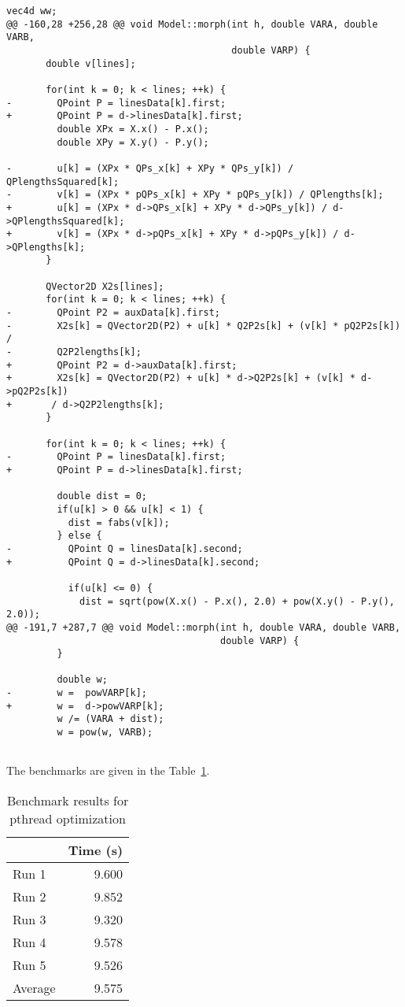 \documentclass[12pt]{article}
\begin{document}
\begin{lstlisting}[caption={Pthreads},label={lst:Pthreads}]
       vec4d ww;
@@ -160,28 +256,28 @@ void Model::morph(int h, double VARA, double VARB, 
                                        double VARP) {
       double v[lines];
 
       for(int k = 0; k < lines; ++k) {
-        QPoint P = linesData[k].first;
+        QPoint P = d->linesData[k].first;
         double XPx = X.x() - P.x();
         double XPy = X.y() - P.y();
 
-        u[k] = (XPx * QPs_x[k] + XPy * QPs_y[k]) / QPlengthsSquared[k];
-        v[k] = (XPx * pQPs_x[k] + XPy * pQPs_y[k]) / QPlengths[k];        
+        u[k] = (XPx * d->QPs_x[k] + XPy * d->QPs_y[k]) / d->QPlengthsSquared[k];
+        v[k] = (XPx * d->pQPs_x[k] + XPy * d->pQPs_y[k]) / d->QPlengths[k];        
       }
 
       QVector2D X2s[lines];
       for(int k = 0; k < lines; ++k) {
-        QPoint P2 = auxData[k].first;
-        X2s[k] = QVector2D(P2) + u[k] * Q2P2s[k] + (v[k] * pQ2P2s[k]) / 
-        Q2P2lengths[k];
+        QPoint P2 = d->auxData[k].first;
+        X2s[k] = QVector2D(P2) + u[k] * d->Q2P2s[k] + (v[k] * d->pQ2P2s[k]) 
+       / d->Q2P2lengths[k];
       }
 
       for(int k = 0; k < lines; ++k) {
-        QPoint P = linesData[k].first;
+        QPoint P = d->linesData[k].first;
 
         double dist = 0;
         if(u[k] > 0 && u[k] < 1) {
           dist = fabs(v[k]);
         } else {
-          QPoint Q = linesData[k].second;
+          QPoint Q = d->linesData[k].second;
 
           if(u[k] <= 0) {
             dist = sqrt(pow(X.x() - P.x(), 2.0) + pow(X.y() - P.y(), 2.0));
@@ -191,7 +287,7 @@ void Model::morph(int h, double VARA, double VARB, 
                                      double VARP) {
         }
 
         double w;
-        w =  powVARP[k];
+        w =  d->powVARP[k];
         w /= (VARA + dist);
         w = pow(w, VARB);
 

\end{lstlisting}

The benchmarks are given in the Table~\ref{tbl-pthread-bench}.

\begin{table}[H]
  \centering
  \begin{tabular}{lr}
    & {\bf Time (s)} \\
    \hline
    Run 1 & 9.600 \\
    Run 2 & 9.852 \\
    Run 3 & 9.320 \\
    Run 4 & 9.578 \\
    Run 5 & 9.526 \\
    \hline
    Average & 9.575 \\
  \end{tabular}
  \caption{Benchmark results for pthread optimization}
  \label{tbl-pthread-bench}
\end{table}
\end{document}
